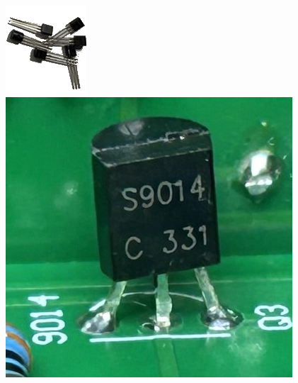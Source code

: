 \documentclass[10pt]{article}
\begin{document}
	\begin{minipage}{0.1\textwidth}\raggedright
		\includegraphics[width=\linewidth, right]{transistor.png}
		\includegraphics[width=\linewidth, right]{transistor-place.png}
	\end{minipage}
	
\end{document}
